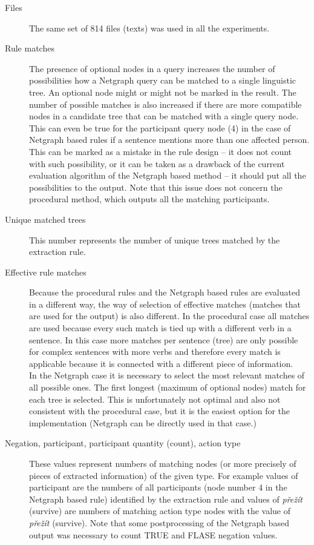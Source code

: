 \begin{description}
	\item[Files]
The same set of 814 files (texts) was used in all the experiments.

	\item[Rule matches]
The presence of optional nodes in a query increases the number of possibilities how a Netgraph query can be matched to a single linguistic tree. An optional node might or might not be marked in the result. The number of possible matches is also increased if there are more compatible nodes in a candidate tree that can be matched with a single query node. This can even be true for the participant query node (4) in the case of Netgraph based rules if a sentence mentions more than one affected person. This can be marked as a mistake in the rule design -- it does not count with such possibility, or it can be taken as a drawback of the current evaluation algorithm of the Netgraph based method -- it should put all the possibilities to the output. Note that this issue does not concern the procedural method, which outputs all the matching participants.

	\item[Unique matched trees]
This number represents the number of unique trees matched by the extraction rule.

	\item[Effective rule matches]
Because the procedural rules and the Netgraph based rules are evaluated in a different way, the way of selection of effective matches (matches that are used for the output) is also different. In the procedural case all matches are used because every such match is tied up with a different verb in a sentence. In this case more matches per sentence (tree) are only possible for complex sentences with more verbs and therefore every match is applicable because it is connected with a different piece of information.\\
In the Netgraph case it is necessary to select the most relevant matches of all possible ones. The first longest (maximum of optional nodes) match for each tree is selected. This is unfortunately not optimal and also not consistent with the procedural case, but it is the easiest option for the implementation (Netgraph can be directly used in that case.)

	\item[Negation, participant, participant quantity (count), action type]
These values represent numbers of matching nodes (or more precisely of pieces of extracted information) of the given type. For example values of participant are the numbers of all participants (node number 4 in the Netgraph based rule) identified by the extraction rule and values of \emph{přežít} (survive) are numbers of matching action type nodes with the value of \emph{přežít} (survive). Note that some postprocessing of the Netgraph based output was necessary to count TRUE and FLASE negation values.


\end{description}
